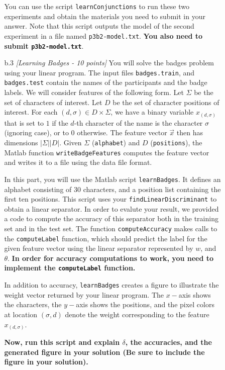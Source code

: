 \begin{enumerate}
\begin{enumerate}
\begin{enumerate}
      You can use the script {\tt learnConjunctions} to run these two 
      experiments and obtain the materials you need to submit in your answer.
      Note that this script outputs the model of the second experiment in a
      file named {\tt p3b2-model.txt}. {\bf You also need to submit {\tt p3b2-model.txt}}. 
  
\item [b.3] {\em [Learning Badges - 10 points]} 
      You will solve the badges problem using your linear program.
      The input files {\tt badges.train}, and {\tt badges.test}
      contain
      the names of the participants and the badge labels.
      We will consider features of the following form.
      Let $\Sigma$ be the set of characters of interest.
      Let $D$ be the set of character positions of interest.
      For each $(d,\sigma) \in D \times \Sigma$, we have a binary variable
      $x_{(d,\sigma)}$ that is set to $1$ if the $d$-th character of the name is 
      the character $\sigma$ (ignoring case), or to $0$ otherwise.
      The feature vector $\vec{x}$ then has dimensions $|\Sigma||D|$.
      Given $\Sigma$ ({\tt alphabet}) and $D$ ({\tt positions}),
      the Matlab function {\tt writeBadgeFeatures} computes the feature vector
      and writes it to a file using the data file format.
      
      In this part, you will use the Matlab script {\tt learnBadges}.
      It defines an alphabet consisting of 30 characters, and 
      a position list containing the first ten positions.
      This script uses your {\tt findLinearDiscriminant} to obtain a linear separator.
      In order to evalute your result,
      we provided a code to compute the accuracy of this separator both in the training
      set and in the test set.
      The function {\tt computeAccuracy} makes calls to the {\tt computeLabel} function,
      which should predict the label for the given feature vector using the linear separator
      represented by $w$, and $\theta$.
      {\bf In order for accuracy computations to work,
      you need to implement the {\tt computeLabel} function.}
      
      In addition to accuracy, {\tt learnBadges} creates a figure to illustrate the 
      weight vector returned by your linear program.
      The $x-$axis shows the characters, the $y-$axis shows the positions, and the 
      pixel colors at location $(\sigma,d)$ denote the weight corresponding to the feature $x_{(d,\sigma)}$.
      
      {\bf Now, run this script and explain $\delta$, the accuracies, and the generated figure
      in your solution (Be sure to include the figure in your solution).}
      

\end{enumerate}
\end{enumerate}
\end{enumerate}
